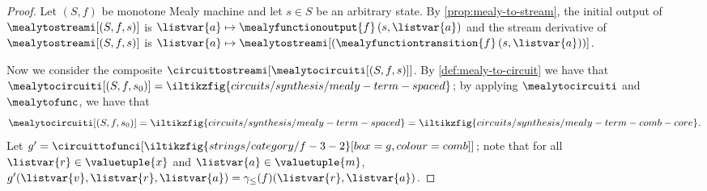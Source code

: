 \begin{proof}
    Let \((S ,f)\) be monotone Mealy machine and let \(s \in S\) be an arbitrary
    state.
    By \cref{prop:mealy-to-stream}, the initial output of
    \(\mealytostreami[(S, f, s)]\) is
    \(\listvar{a} \mapsto \mealyfunctionoutput{f}\left(s, \listvar{a}\right)\)
    and the stream derivative of \(\mealytostreami[(S, f, s)]\) is \(
    \listvar{a}
    \mapsto
    \mealytostreami[(\mealyfunctiontransition{f}\left(s, \listvar{a}\right))]
    \).

    Now we consider the composite
    \(\circuittostreami[\mealytocircuiti[(S, f, s)]]\).
    By \cref{def:mealy-to-circuit} we have that \(
    \mealytocircuiti[(S, f, s_0)]
    =
    \iltikzfig{circuits/synthesis/mealy-term-spaced}
    \); by applying \(\mealytocircuiti\) and \(\mealytofunc\),
    we have that \[
        \mealytocircuiti[(S, f, s_0)]
        =
        \iltikzfig{circuits/synthesis/mealy-term-spaced}
        =
        \iltikzfig{circuits/synthesis/mealy-term-comb-core}.
    \]
    Let \(
    g^\prime
    =
    \circuittofunci[\iltikzfig{strings/category/f-3-2}[box=g,colour=comb]]
    \); note that for all \(\listvar{r} \in \valuetuple{x}\) and
    \(\listvar{a} \in \valuetuple{m}\),
    \(g^\prime(\listvar{v}, \listvar{r}, \listvar{a})
    =
    \gamma_\leq(f)(\listvar{r},\listvar{a})
    \).


\end{proof}

